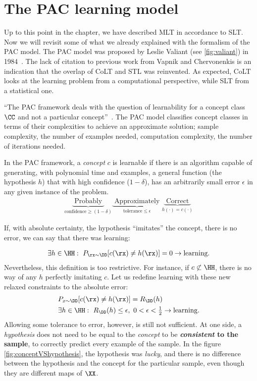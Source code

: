 \section{The PAC learning model}
Up to this point in the chapter, we have described MLT in accordance to \ac{SLT}. Now we will revisit some of what we already explained with the formalism of the PAC model.
The PAC model was proposed by Leslie Valiant (see \cref{fig:valiant}) in 1984~\cite{valiant:1984}. The lack of citation to previous work from Vapnik and Chervonenkis is an indication that the overlap of CoLT and STL was reinvented. As expected, CoLT looks at the learning problem from a computational perspective, while SLT from a statistical one.

``The PAC framework deals with the question of learnability for a concept class \(\CC\) and not a particular concept''~\cite{mohri:2012}. The PAC model classifies concept classes in terms of their complexities to achieve an approximate solution; sample complexity, the number of examples needed, computation complexity, the number of iterations needed.

In the PAC framework, a \emph{concept} \(c\) is learnable if there is an algorithm capable of generating, with polynomial time and examples, a general function (the hypothesis \(h\)) that with high confidence (\(1-\delta\)), has an arbitrarily small error \(\epsilon\) in any given instance of the problem.
\begin{align}
	\underbrace{\text{ Probably }}_{\textrm{confidence} \geq(1-\delta)} \underbrace{\text{ Approximately }}_{\textrm{tolerance} \leq\epsilon} \underbrace{\text{ Correct }}_{h(\cdot)=c(\cdot)}
\end{align}

If, with absolute certainty, the hypothesis ``imitates'' the concept, \ie there is no error, we can say that there was learning:

\begin{align}
	\exists h \in \HH: ~ P_{\rx \sim \DD}[c(\rx)\neq h(\rx)]=0 \to \text{learning}.
\end{align}
Nevertheless, this definition is too restrictive. For instance, if \(c \not \subset \HH\), there is no way of any \(h\) perfectly imitating \(c\). Let us redefine learning with these new relaxed constraints to the absolute error:
\begin{align}
	&P_{x \sim \DD}[c(\rx) \neq h(\rx)]= R_{\DD}(h)\\
	&\exists h \in \HH:~ R_{\DD}(h) \leq \epsilon, ~ 0 < \epsilon < \tfrac{1}{2} \to \text{learning}.
\end{align}
Allowing some tolerance to error, however, is still not sufficient. At one side, a \emph{hypothesis} does not need to be equal to the \emph{concept} to be \textbf{\emph{consistent} to the sample}, \ie to correctly predict every example of the sample. In the figure \ref{fig:conceptVShypothesis}, the hypothesis was \emph{lucky}, and there is no difference between the hypothesis and the concept for the particular sample, even though they are different maps of \(\XX\).

